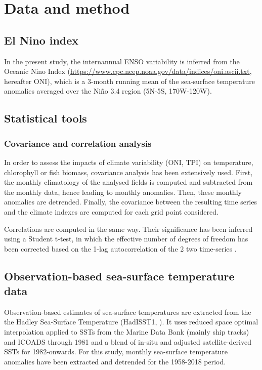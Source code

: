 \section{Data and method}

\subsection{El Nino index}
\label{sec:oni}

In the present study, the internannual ENSO variability is inferred from the Oceanic Nino Index (\url{https://www.cpc.ncep.noaa.gov/data/indices/oni.ascii.txt}, hereafter ONI), which is a 3-month running mean of the sea-surface temperature anomalies averaged over the Niño 3.4 region (5N-5S, 170W-120W).\\

\subsection{Statistical tools}

\subsubsection{Covariance and correlation analysis}
\label{sec:cov}

In order to assess the impacts of climate variability (ONI, TPI) on temperature, chlorophyll or fish biomass, covariance analysis has been extensively used. First, the monthly climatology of the analysed fields is computed and subtracted from the monthly data, hence leading to monthly anomalies. Then, these monthly anomalies are detrended. Finally, the covariance between the resulting time series and the climate indexes are computed for each grid point considered. 

Correlations are computed in the same way. Their significance has been inferred using a Student t-test, in which the effective number of degrees of freedom has been corrected based on the 1-lag autocorrelation of the 2 two time-series \citep{brethertonEffectiveNumberSpatial1999}.

\subsection{Observation-based sea-surface temperature data}
\label{sec:sst}

Observation-based estimates of sea-surface temperatures are extracted from the the Hadley Sea-Surface Temperature (HadISST1, \citealt{raynerGlobalAnalysesSea2003}). It uses reduced space optimal interpolation applied to SSTs from the Marine Data Bank (mainly ship tracks) and ICOADS through 1981 and a blend of in-situ and adjusted satellite-derived SSTs for 1982-onwards. For this study, monthly sea-surface temperature anomalies have been extracted and detrended for the 1958-2018 period.

